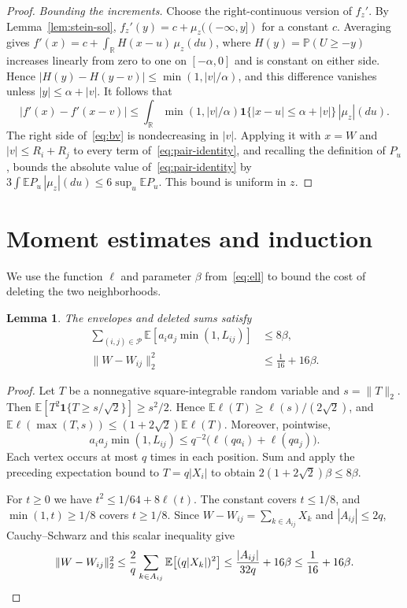 \documentclass[11pt,a4paper]{article}
\newtheorem{lemma}[theorem]{Lemma}
\newcommand{\E}{\mathbb E}
\newcommand{\PP}{\mathbb P}
\newcommand{\R}{\mathbb R}
\newcommand{\ind}{\mathbf 1}
\newcommand{\pairs}{\mathcal P}
\begin{document}
\begin{proof}
\emph{Bounding the increments.}
Choose the right-continuous version of $f_z'$. By Lemma~\ref{lem:stein-sol},
$f_z'(y)=c+\mu_z((-\infty,y])$ for a constant $c$. Averaging gives
$f'(x)=c+\int_\R H(x-u)\,\mu_z(du)$, where $H(y)=\PP(U\ge-y)$
increases linearly from zero to one on $[-\alpha,0]$ and is constant
on either side. Hence $|H(y)-H(y-v)|\le\min(1,|v|/\alpha)$, and this
difference vanishes unless $|y|\le\alpha+|v|$. It follows that
\begin{equation}
 |f'(x)-f'(x-v)|\le\int_{\R}
 \min(1,|v|/\alpha)\ind\{|x-u|\le\alpha+|v|\}\,|\mu_z|(du).
 \label{eq:bv}
\end{equation}
The right side of~\eqref{eq:bv} is nondecreasing in $|v|$. Applying
it with $x=W$ and $|v|\le R_i+R_j$ to every term
of~\eqref{eq:pair-identity}, and recalling the definition of $P_u$,
bounds the absolute value of~\eqref{eq:pair-identity} by $3\int \E P_u\,|\mu_z|(du)\le6\sup_u\E P_u$. This bound is uniform in $z$.
\end{proof}

\section{Moment estimates and induction}\label{sec:induction}
We use the function $\ell$ and parameter $\beta$ from~\eqref{eq:ell}
to bound the cost of deleting the two neighborhoods.

\begin{lemma}\label{lem:mom}
The envelopes and deleted sums satisfy
\begin{align}
 \sum_{(i,j)\in\pairs}\E[a_i a_j\min(1,L_{ij})]&\le 8\beta, \label{eq:moment}\\
 \|W-W_{ij}\|_2^2&\le \tfrac1{16}+16\beta. \label{eq:variance}
\end{align}
\end{lemma}
\begin{proof}
Let $T$ be a nonnegative square-integrable random variable and $s=\|T\|_2$. Then $\E[T^2\ind\{T\ge s/\sqrt{2}\}]\ge s^2/2$. Hence $\E\ell(T)\ge \ell(s)/(2\sqrt2)$, and $\E\ell(\max(T,s))\le(1+2\sqrt2)\E\ell(T)$. Moreover, pointwise,
\[
 a_i a_j\min(1,L_{ij})\le q^{-2}\big(\ell(q a_i)+\ell(q a_j)\big).
\]
Each vertex occurs at most $q$ times in each position. Sum and apply the preceding expectation bound to $T=q|X_i|$ to obtain $2(1+2\sqrt2)\beta\le8\beta$.

For $t\ge0$ we have $t^2\le 1/64+8\ell(t)$. The constant covers $t\le1/8$,
and $\min(1,t)\ge1/8$ covers $t\ge1/8$.
Since $W-W_{ij}=\sum_{k\in A_{ij}}X_k$ and $|A_{ij}|\le2q$,
Cauchy--Schwarz and this scalar inequality give
\[
 \|W-W_{ij}\|_2^2
 \le \frac{2}{q}\sum_{k\in A_{ij}}\E\big[(q|X_k|)^2\big]
 \le \frac{|A_{ij}|}{32q}+16\beta
 \le \frac1{16}+16\beta . \qedhere
\]
\end{proof}
\end{document}
